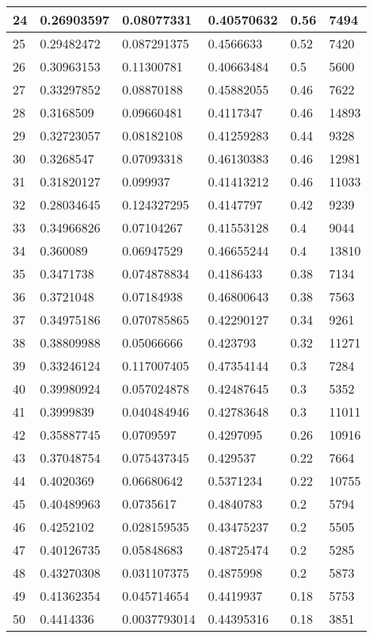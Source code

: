 \begin{longtable}{|l|l|l|l|l|l|}
24 & 0.26903597 & 0.08077331 & 0.40570632 & 0.56 & 7494 \\ \hline 
25 & 0.29482472 & 0.087291375 & 0.4566633 & 0.52 & 7420 \\ \hline 
26 & 0.30963153 & 0.11300781 & 0.40663484 & 0.5 & 5600 \\ \hline 
27 & 0.33297852 & 0.08870188 & 0.45882055 & 0.46 & 7622 \\ \hline 
28 & 0.3168509 & 0.09660481 & 0.4117347 & 0.46 & 14893 \\ \hline 
29 & 0.32723057 & 0.08182108 & 0.41259283 & 0.44 & 9328 \\ \hline 
30 & 0.3268547 & 0.07093318 & 0.46130383 & 0.46 & 12981 \\ \hline 
31 & 0.31820127 & 0.099937 & 0.41413212 & 0.46 & 11033 \\ \hline 
32 & 0.28034645 & 0.124327295 & 0.4147797 & 0.42 & 9239 \\ \hline 
33 & 0.34966826 & 0.07104267 & 0.41553128 & 0.4 & 9044 \\ \hline 
34 & 0.360089 & 0.06947529 & 0.46655244 & 0.4 & 13810 \\ \hline 
35 & 0.3471738 & 0.074878834 & 0.4186433 & 0.38 & 7134 \\ \hline 
36 & 0.3721048 & 0.07184938 & 0.46800643 & 0.38 & 7563 \\ \hline 
37 & 0.34975186 & 0.070785865 & 0.42290127 & 0.34 & 9261 \\ \hline 
38 & 0.38809988 & 0.05066666 & 0.423793 & 0.32 & 11271 \\ \hline 
39 & 0.33246124 & 0.117007405 & 0.47354144 & 0.3 & 7284 \\ \hline 
40 & 0.39980924 & 0.057024878 & 0.42487645 & 0.3 & 5352 \\ \hline 
41 & 0.3999839 & 0.040484946 & 0.42783648 & 0.3 & 11011 \\ \hline 
42 & 0.35887745 & 0.0709597 & 0.4297095 & 0.26 & 10916 \\ \hline 
43 & 0.37048754 & 0.075437345 & 0.429537 & 0.22 & 7664 \\ \hline 
44 & 0.4020369 & 0.06680642 & 0.5371234 & 0.22 & 10755 \\ \hline 
45 & 0.40489963 & 0.0735617 & 0.4840783 & 0.2 & 5794 \\ \hline 
46 & 0.4252102 & 0.028159535 & 0.43475237 & 0.2 & 5505 \\ \hline 
47 & 0.40126735 & 0.05848683 & 0.48725474 & 0.2 & 5285 \\ \hline 
48 & 0.43270308 & 0.031107375 & 0.4875998 & 0.2 & 5873 \\ \hline 
49 & 0.41362354 & 0.045714654 & 0.4419937 & 0.18 & 5753 \\ \hline 
50 & 0.4414336 & 0.0037793014 & 0.44395316 & 0.18 & 3851 \\ \hline 
\end{longtable}
